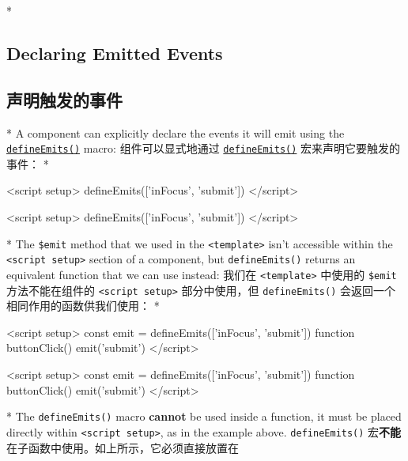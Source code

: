 \begin{paracol}{2}

\switchcolumn[0]*%
\subsection{Declaring Emitted Events}
\switchcolumn
\subsection{声明触发的事件}
\switchcolumn[0]*%
A component can explicitly declare the events it will emit using the
\href{https://vuejs.org/api/sfc-script-setup.html\#defineprops-defineemits}{\texttt{defineEmits()}}
macro:
\switchcolumn
组件可以显式地通过
\href{https://cn.vuejs.org/api/sfc-script-setup.html\#defineprops-defineemits}{\texttt{defineEmits()}}
宏来声明它要触发的事件：
\switchcolumn[0]*%
\begin{codeHtml}
<script setup>
defineEmits(['inFocus', 'submit'])
</script>
\end{codeHtml}
\switchcolumn
\begin{codeHtml}
<script setup>
defineEmits(['inFocus', 'submit'])
</script>
\end{codeHtml}
\switchcolumn[0]*%
The \texttt{\$emit} method that we used in the
\texttt{\textless{}template\textgreater{}} isn't accessible within the
\texttt{\textless{}script\ setup\textgreater{}} section of a component,
but \texttt{defineEmits()} returns an equivalent function that we can
use instead:
\switchcolumn
我们在 \texttt{\textless{}template\textgreater{}} 中使用的
\texttt{\$emit} 方法不能在组件的
\texttt{\textless{}script\ setup\textgreater{}} 部分中使用，但
\texttt{defineEmits()} 会返回一个相同作用的函数供我们使用：
\switchcolumn[0]*%
\begin{codeHtml}
<script setup>
const emit = defineEmits(['inFocus', 'submit'])
function buttonClick() {
  emit('submit')
}
</script>
\end{codeHtml}
\switchcolumn
\begin{codeHtml}
<script setup>
const emit = defineEmits(['inFocus', 'submit'])
function buttonClick() {
  emit('submit')
}
</script>
\end{codeHtml}
\switchcolumn[0]*%
The \texttt{defineEmits()} macro \textbf{cannot} be used inside a
function, it must be placed directly within
\texttt{\textless{}script\ setup\textgreater{}}, as in the example
above.
\switchcolumn
\texttt{defineEmits()}
宏\textbf{不能}在子函数中使用。如上所示，它必须直接放置在

\end{paracol}

